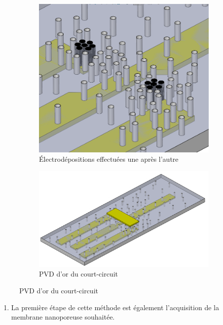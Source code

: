 \begin{itemize}
\begin{figure}[H]
\begin{subfigure}{0.45\textwidth}
                  \includegraphics[scale = 0.27]{assets/figures/ED_B.png}
                  \caption{Électrodépositions effectuées une après l'autre}
              \end{subfigure}
              \begin{subfigure}{0.45\textwidth}
                  \includegraphics[scale = 0.27]{assets/figures/Court_circuit_B.png}
                  \caption{PVD d'or du court-circuit}
              \end{subfigure}
          \end{figure}
          \begin{enumerate}[label=(\alph*), wide, labelwidth=!, labelindent = 0pt]
              \item La première étape de cette méthode est également l'acquisition de la membrane nanoporeuse souhaitée.\\

\end{enumerate}
\end{itemize}
